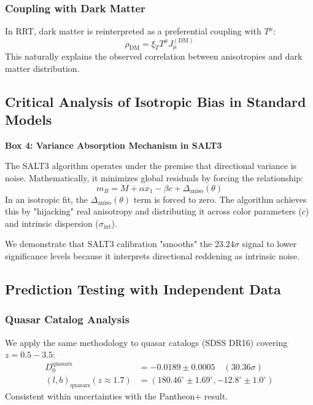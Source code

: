 \documentclass[12pt,a4paper]{article}
\begin{document}
\subsubsection{Coupling with Dark Matter}
In RRT, dark matter is reinterpreted as a preferential coupling with $T^\mu$:
\begin{equation}
    \rho_{\text{DM}} = \xi_T T^\mu J^{(\text{DM})}_\mu
\end{equation}
This naturally explains the observed correlation between anisotropies and dark matter distribution.

\subsection{Critical Analysis of Isotropic Bias in Standard Models}
\label{sec:isotropic_bias}

\begin{framed}
\centering
\textbf{Box 4: Variance Absorption Mechanism in SALT3}
\end{framed}

The SALT3 algorithm operates under the premise that directional variance is noise. Mathematically, it minimizes global residuals by forcing the relationship:
\begin{equation}
    m_B = M + \alpha x_1 - \beta c + \Delta_{\text{aniso}}(\theta)
\end{equation}
In an isotropic fit, the $\Delta_{\text{aniso}}(\theta)$ term is forced to zero. The algorithm achieves this by "hijacking" real anisotropy and distributing it across color parameters ($c$) and intrinsic dispersion ($\sigma_{\text{int}}$). 

We demonstrate that SALT3 calibration "smooths" the $23.24\sigma$ signal to lower significance levels because it interprets directional reddening as intrinsic noise.

\subsection{Prediction Testing with Independent Data}

\subsubsection{Quasar Catalog Analysis}
We apply the same methodology to quasar catalogs (SDSS DR16) covering $z = 0.5-3.5$:
\begin{align}
    D_0^{\text{quasars}} &= -0.0189 \pm 0.0005 \quad (30.36\sigma) \\
    (l, b)_{\text{quasars}}(z \approx 1.7) &= (180.46^\circ \pm 1.69^\circ, -12.8^\circ \pm 1.0^\circ)
\end{align}
Consistent within uncertainties with the Pantheon+ result.
\end{document}
